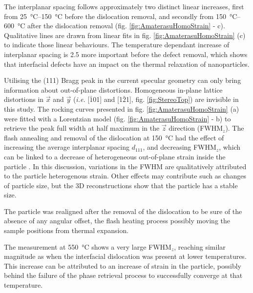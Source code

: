 The interplanar spacing follows approximately two distinct linear increases, first from \qtyrange{25}{150}{\degreeCelsius} before the dislocation removal, and secondly from \qtyrange{150}{600}{\degreeCelsius} after the dislocation removal (fig. \ref{fig:AmaterasuHomoStrain} - c).
Qualitative lines are drawn from linear fits in fig. \ref{fig:AmaterasuHomoStrain} (c) to indicate those linear behaviours.
The temperature dependant increase of interplanar spacing is \num{2.5} more important before the defect removal, which shows that interfacial defects have an impact on the thermal relaxation of nanoparticles.

Utilising the (111) Bragg peak in the current specular geometry can only bring information about out-of-plane distortions.
Homogeneous in-plane lattice distortions in $\vec{x}$ and $\vec{y}$ (\textit{i.e.} [$\bar{1}$01] and [1$\bar{2}$1], fig. \ref{fig:StereoTop}) are invisible in this study.
The rocking curves presented in fig. \ref{fig:AmaterasuHomoStrain} (a) were fitted with a Lorentzian model (fig. \ref{fig:AmaterasuHomoStrain} - b) to retrieve the peak full width at half maximum in the $\vec{z}$ direction (FWHM$_z$).
The flash annealing and removal of the dislocation at \qty{150}{\degreeCelsius} had the effect of increasing the average interplanar spacing $d_{111}$, and decreasing FWHM$_z$, which can be linked to a decrease of heterogeneous out-of-plane strain inside the particle \parencite{Warren1990}.
In this discussion, variations in the FWHM are qualitatively attributed to the particle heterogenous strain.
Other effects may contribute such as changes of particle size, but the 3D reconstructions show that the particle has a stable size.

The particle was realigned after the removal of the dislocation to be sure of the absence of any angular offset, the flash heating process possibly moving the sample positions from thermal expansion.

The measurement at \qty{550}{\degreeCelsius} shows a very large FWHM$_z$, reaching similar magnitude as when the interfacial dislocation was present at lower temperatures.
This increase can be attributed to an increase of strain in the particle, possibly behind the failure of the phase retrieval process to successfully converge at that temperature.

